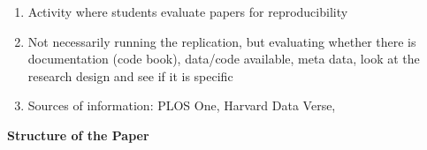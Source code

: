 \documentclass{article}
\begin{document}
\begin{enumerate}
  \begin{enumerate}
  \def\labelenumii{\alph{enumii}}
  \item
    Activity where students evaluate papers for reproducibility\\
  \item
    Not necessarily running the replication, but evaluating whether
    there is documentation (code book), data/code available, meta data,
    look at the research design and see if it is specific\\
  \item
    Sources of information: PLOS One, Harvard Data Verse,
  \end{enumerate}
\end{enumerate}


\textbf{Structure of the Paper}
\end{document}
